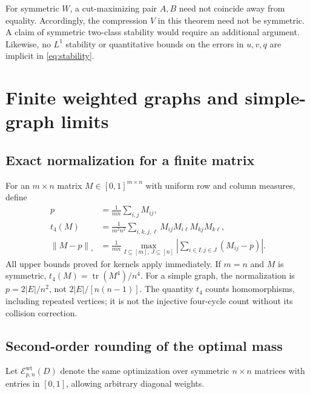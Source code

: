 \documentclass[11pt]{article}
\theoremstyle{definition}
\newcommand{\1}{\mathbf 1}
\newcommand{\Cut}[1]{\left\|#1\right\|_{\square}}
\newcommand{\calE}{\mathcal E}
\newcommand{\tr}{\operatorname{tr}}
\begin{document}
For symmetric $W$, a cut-maximizing pair $A,B$ need not coincide away from equality. Accordingly, the compression $V$ in this theorem need not be symmetric. A claim of symmetric two-class stability would require an additional argument. Likewise, no $L^1$ stability or quantitative bounds on the errors in $u,v,q$ are implicit in \eqref{eq:stability}.

\section{Finite weighted graphs and simple-graph limits}\label{sec:finite}
\subsection{Exact normalization for a finite matrix}
For an $m\times n$ matrix $M\in[0,1]^{m\times n}$ with uniform row and column measures, define
\begin{align*}
 p&=\frac1{mn}\sum_{i,j}M_{ij},\\
 t_4(M)&=\frac1{m^2n^2}\sum_{i,k,j,\ell}
                  M_{ij}M_{i\ell}M_{kj}M_{k\ell},\\
 \Cut{M-p}&=\frac1{mn}\max_{I\subseteq[m],\,J\subseteq[n]}
                 \left|\sum_{i\in I,j\in J}(M_{ij}-p)\right|.
\end{align*}
All upper bounds proved for kernels apply immediately. If $m=n$ and $M$ is symmetric, $t_4(M)=\tr(M^4)/n^4$. For a simple graph, the normalization is $p=2|E|/n^2$, not $2|E|/[n(n-1)]$. The quantity $t_4$ counts homomorphisms, including repeated vertices; it is not the injective four-cycle count without its collision correction.

\subsection{Second-order rounding of the optimal mass}
Let $\calE_{p,n}^{\mathrm{wt}}(D)$ denote the same optimization over symmetric $n\times n$ matrices with entries in $[0,1]$, allowing arbitrary diagonal weights.
\end{document}
